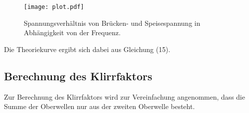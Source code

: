 \begin{figure}[H]
  \centering
  \texttt{[image: plot.pdf]}
  \caption{Spannungsverhältnis von Brücken- und Speisespannung in Abhängigkeit von der Frequenz.}
  \label{fig:plot}
\end{figure}

Die Theoriekurve ergibt sich dabei aus Gleichung (15).

\subsection{Berechnung des Klirrfaktors}
Zur Berechnung des Klirrfaktors wird zur Vereinfachung angenommen, dass die Summe
der Oberwellen nur aus der zweiten Oberwelle besteht.
